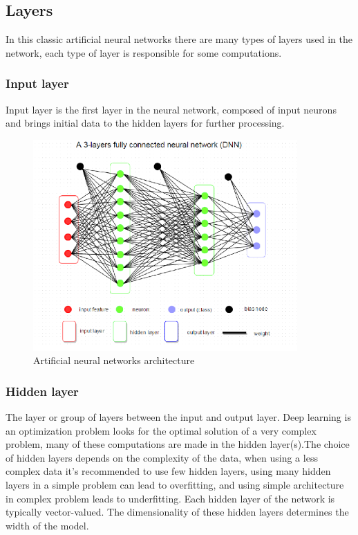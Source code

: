 \subsection{Layers}
In this classic artificial neural networks there are many types of layers used in the
network, each type of layer is responsible for some computations.
\subsubsection{Input layer}
Input layer is the first layer in the neural network, composed of input neurons and
brings initial data to the hidden layers for further processing.
\begin{figure}[!h]
    \centering
    \includegraphics[width=0.9\textwidth]{chapters/chapter02/fig02/dnn.PNG}
    \caption{Artificial neural networks architecture}
    \label{fig:my_label}
\end{figure}
\subsubsection{Hidden layer}
The layer or group of layers between the input and output layer. Deep learning is an
optimization problem looks for the optimal solution of a very complex problem, many of
these computations are made in the hidden layer(s).The choice of hidden layers depends
on the complexity of the data, when using a less complex data it’s recommended to use
few hidden layers, using many hidden layers in a simple problem can lead to overfitting,
and using simple architecture in complex problem leads to underfitting.
Each hidden layer of the network is typically vector-valued. The dimensionality of these
hidden layers determines the width of the model.
\cite{art20}
